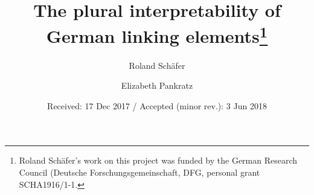 \smartqed

\title{The plural interpretability of German linking elements\thanks{Roland Schäfer's work on this project was funded by the German Research Council (Deutsche Forschungsgemeinschaft, DFG, personal grant SCHA1916/1-1.}}
\author{Roland Schäfer \and Elizabeth Pankratz}
\date{Received: 17 Dec 2017 / Accepted (minor rev.): 3 Jun 2018}
